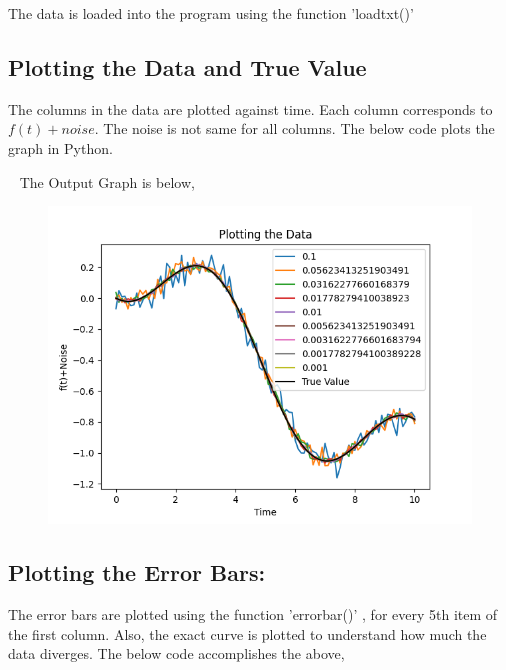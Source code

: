 \documentclass[12pt, a4paper]{report}
\begin{document}
\noindent
The data is loaded into the program using the function {\selectfont
'loadtxt()'
} 
\subsection{Plotting the Data and True Value}
The columns in the data are plotted against time. Each column corresponds to $f(t)+noise$. The noise is not same for all columns. The below code plots the graph in Python.


 \ 
 \break
\noindent
The Output Graph is below,
\begin{figure}[h!]
    \centering
    \includegraphics[scale=1]{Figure_1.png} 
    \caption{}
    \label{fig:my_label}
\end{figure}

\subsection{Plotting the Error Bars:}
The error bars are plotted using the function {\selectfont
'errorbar()'
}, for every 5th item of the first column. Also, the exact curve is plotted to understand how much the data diverges. The below code accomplishes the above,\
 
\end{document}

